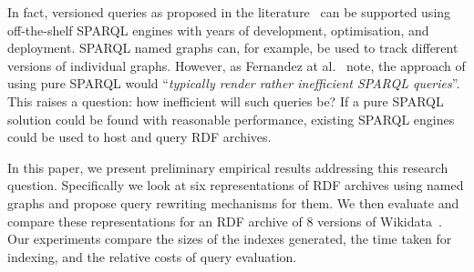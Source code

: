 \documentclass{llncs}
\begin{document}


In fact, versioned queries as proposed in the literature~\cite{FernandezPU15} can be supported using off-the-shelf SPARQL engines with years of development, optimisation, and deployment. SPARQL named graphs can, for example, be used to track different versions of individual graphs. However, as Fernandez at al.~\cite{FernandezUPK19} note, the approach of using pure SPARQL would ``\textit{typically render rather inefficient SPARQL queries}''. This raises a question: how inefficient will such queries be? If a pure SPARQL solution could be found with reasonable performance, existing SPARQL engines could be used to host and query RDF archives.

In this paper, we present preliminary empirical results addressing this research question. Specifically we look at six representations of RDF archives using named graphs and propose query rewriting mechanisms for them. We then evaluate and compare these representations for an RDF archive of 8 versions of Wikidata~\cite{VrandecicK14}. Our experiments compare the sizes of the indexes generated, the time taken for indexing, and the relative costs of query evaluation.

\end{document}
